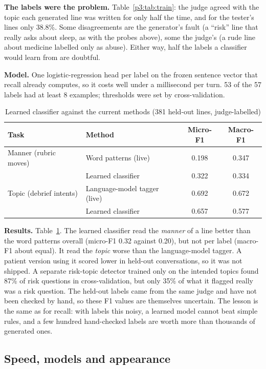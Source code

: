 \documentclass[journal]{IEEEtran}
\begin{document}
\textbf{The labels were the problem.} Table~\ref{p3:tab:train}: the judge agreed with the topic each generated line was written for only half the
time, and for the tester's lines only 38.8\%. Some disagreements are the generator's fault (a ``risk'' line that really asks about sleep, as with
the probes above), some the judge's (a rude line about medicine labelled only as abuse). Either way, half the labels a classifier would learn from
are doubtful.

\textbf{Model.} One logistic-regression head per label on the frozen sentence vector that recall already computes, so it costs well under a
millisecond per turn. 53 of the 57 labels had at least 8 examples; thresholds were set by cross-validation.

\begin{table}[t]
\caption{Learned classifier against the current methods (381 held-out lines, judge-labelled)}
\label{p3:tab:clf}
\centering
\footnotesize
\begin{tabular}{@{}llcc@{}}
\toprule
Task & Method & Micro-F1 & Macro-F1\\
\midrule
Manner (rubric moves) & Word patterns (live) & 0.198 & 0.347\\
& Learned classifier & 0.322 & 0.334\\
\midrule
Topic (debrief intents) & Language-model tagger (live) & 0.692 & 0.672\\
& Learned classifier & 0.657 & 0.577\\
\bottomrule
\end{tabular}
\end{table}

\textbf{Results.} Table~\ref{p3:tab:clf}. The learned classifier read the \emph{manner} of a line better than the word patterns overall (micro-F1 0.32 against 0.20), but not per label (macro-F1 about equal). It read the \emph{topic} worse than the language-model tagger. A patient
version using it scored lower in held-out conversations, so it was not shipped. A separate risk-topic detector trained only on the intended topics
found 87\% of risk questions in cross-validation, but only 35\% of what it flagged really was a risk question. The held-out labels came from the
same judge and have not been checked by hand, so these F1 values are themselves uncertain. The lesson is the same as for recall: with labels this
noisy, a learned model cannot beat simple rules, and a few hundred hand-checked labels are worth more than thousands of generated ones.


\subsection{Speed, models and appearance}
\end{document}
